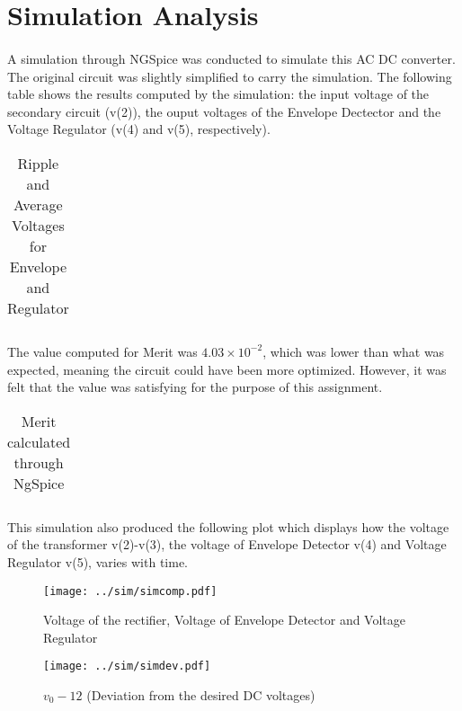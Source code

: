 \newpage{}

\section{Simulation Analysis}
\label{sec:simulation}
\paragraph{}


\par A simulation through NGSpice was conducted to simulate this AC DC converter. The original circuit was slightly simplified to carry the simulation.
The following table shows the results computed by the simulation: the input voltage of the secondary circuit (v(2)), the ouput voltages of the Envelope Dectector and the Voltage Regulator (v(4) and v(5), respectively).


\begin{table}[H]
  \centering
  \begin{tabular}{|c|c|}
    \hline    
    
  \end{tabular}
  \caption{Ripple and Average Voltages for Envelope and Regulator}
  \label{sim1}
\end{table}

\par The value computed for Merit was $4.03\times 10^{-2}$, which was lower than what was expected, meaning the circuit could have been more optimized. However, it was felt that the value was satisfying for the purpose of this assignment.

\begin{table}[H]
  \centering
  \begin{tabular}{|c|c|}
    \hline    
    
  \end{tabular}
  \caption{Merit calculated through NgSpice}
  \label{sim1}
\end{table}

\par This simulation also produced the following plot which displays how the voltage of the transformer v(2)-v(3), the voltage of Envelope Detector v(4) and Voltage Regulator v(5), varies with time.

\begin{figure}[H]
    \texttt{[image: ../sim/simcomp.pdf]}
    \centering
    \caption{Voltage of the rectifier, Voltage of Envelope Detector and Voltage Regulator}
    \label{mag}
\end{figure}

\begin{figure}[H]
    \texttt{[image: ../sim/simdev.pdf]}
    \centering
    \caption{$v_0-12$ (Deviation from the desired DC voltages)}
    \label{mag}
\end{figure}


